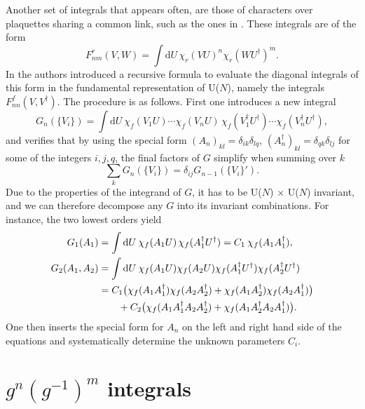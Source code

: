 Another set of integrals that appears often, are those of characters over
plaquettes sharing a common link, such as the ones in
. These integrals are of the form
%
\begin{equation}
  F_{nm}^r(V,W) = \int \mathrm{d} U \, \chi_r(VU)^n \chi_r(WU^{\dagger})^m.
\end{equation}
%
In \citep{Bars:1979xb} the authors introduced a recursive formula to evaluate
the diagonal integrals of this form in the fundamental representation of U($N$),
namely the integrals $F_{nn}^f(V,V^{\dagger})$. The procedure is as follows. First one
introduces a new integral
%
\begin{equation}
  G_n(\{V_i\}) = \int \mathrm{d} U \> \chi_f(V_1 U) \cdots \chi_f(V_n U) \,
    \chi_f(V_1^{\dagger} U^{\dagger}) \cdots \chi_f(V_n^{\dagger} U^{\dagger}),
\end{equation}
%
and verifies that by using the special form $(A_n)_{kl} = \delta_{ik}
\delta_{lq}$, $(A_n^{\dagger})_{kl} = \delta_{qk} \delta_{lj}$ for some of the
integers $i,j,q$, the final factors of $G$ simplify when summing over $k$
%
\begin{equation}
  {\textstyle\sum_k} G_n(\{V_i\}) = \delta_{ij} G_{n-1}(\{V_i\}').
\end{equation}
%
Due to the properties of the integrand of $G$, it has to be U($N$) $\times$
U($N$) invariant, and we can therefore decompose any $G$ into its invariant
combinations. For instance, the two lowest orders yield
%
\begin{align}
  G_1(A_1) &= \int \mathrm{d} U \> \chi_f(A_1 U) \, \chi_f(A_1^{\dagger} U^{\dagger})
   = C_1 \> \chi_f(A_1 A_1^{\dagger}), \\
  G_2(A_1,A_2) &= \int \mathrm{d} U \> \chi_f(A_1 U) \chi_f(A_2 U) 
  \chi_f(A_1^{\dagger} U^{\dagger}) \chi_f(A_2^{\dagger} U^{\dagger})  \nonumber \\
  &= C_1 \big( \chi_f(A_1 A_1^{\dagger}) \chi_f(A_2 A_2^{\dagger}) + \chi_f(A_1
  A_2^{\dagger}) \chi_f(A_2 A_1^{\dagger})\big) \nonumber \\
  &\hskip2em+ C_2 \big(\chi_f(A_1 A_1^{\dagger} A_2 A_2^{\dagger})
  + \chi_f(A_1 A_2^{\dagger} A_2 A_1^{\dagger}) \big).
\end{align}
%
One then inserts the special form for $A_n$ on the left and right hand side of
the equations and systematically determine the unknown parameters $C_i$.

\section{\texorpdfstring{$g^n (g^{-1})^m$}{Un Udm} integrals} \label{sec:sun_integrals}

